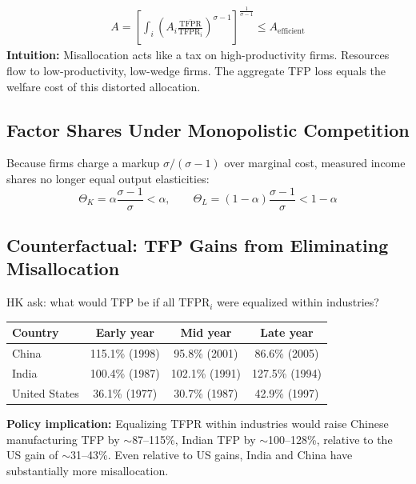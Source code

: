\documentclass[a4paper,11pt]{article}
\newcommand{\TFPR}{\mathrm{TFPR}}
\begin{document}
\begin{resultbox}
\begin{align*}
\boxed{A = \left[\int_i \left(A_i \frac{\overline{\TFPR}}{\TFPR_i}\right)^{\sigma-1}\right]^{\frac{1}{\sigma-1}} \leq A_{\text{efficient}}}
\tag{Aggregate TFP}
\end{align*}
\textbf{Intuition:} Misallocation acts like a tax on high-productivity firms. Resources flow to low-productivity, low-wedge firms. The aggregate TFP loss equals the welfare cost of this distorted allocation.
\end{resultbox}

\subsection*{Factor Shares Under Monopolistic Competition}

Because firms charge a markup $\sigma/(\sigma-1)$ over marginal cost, measured income shares no longer equal output elasticities:
\[
\Theta_K = \alpha \frac{\sigma-1}{\sigma} < \alpha, \qquad \Theta_L = (1-\alpha)\frac{\sigma-1}{\sigma} < 1-\alpha
\]

\subsection*{Counterfactual: TFP Gains from Eliminating Misallocation}

HK ask: what would TFP be if all $\TFPR_i$ were equalized within industries?

\begin{center}
\begin{tabular}{lccc}
\toprule
Country & Early year & Mid year & Late year \\
\midrule
China & 115.1\% (1998) & 95.8\% (2001) & 86.6\% (2005) \\
India & 100.4\% (1987) & 102.1\% (1991) & 127.5\% (1994) \\
United States & 36.1\% (1977) & 30.7\% (1987) & 42.9\% (1997) \\
\bottomrule
\end{tabular}
\end{center}

\begin{resultbox}
\textbf{Policy implication:} Equalizing TFPR within industries would raise Chinese manufacturing TFP by $\sim$87--115\%, Indian TFP by $\sim$100--128\%, relative to the US gain of $\sim$31--43\%. Even relative to US gains, India and China have substantially more misallocation.
\end{resultbox}
\end{document}
